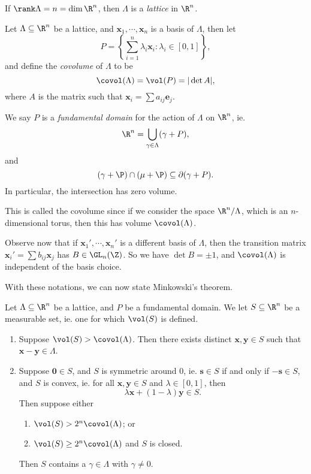 \documentclass[a4paper]{article}
\begin{document}
\begin{defi}[Lattice]
  If $\rank \Lambda = n = \dim \R^n$, then $\Lambda$ is a \emph{lattice} in $\R^n$.
\end{defi}

\begin{defi}
  Let $\Lambda \subseteq \R^n$ be a lattice, and $\mathbf{x}_1, \cdots, \mathbf{x}_n$ is a basis of $\Lambda$, then let
  \[
    P = \left\{\sum_{i = 1}^n \lambda_i \mathbf{x}_i: \lambda_i \in [0, 1]\right\},
  \]
  and define the \emph{covolume} of $\Lambda$ to be
  \[
    \covol(\Lambda) = \vol(P) = |\det A|,
  \]
  where $A$ is the matrix such that $\mathbf{x}_i = \sum a_{ij} \mathbf{e}_j$.

  We say $P$ is a \emph{fundamental domain} for the action of $\Lambda$ on $\R^n$, ie.
  \[
    \R^n = \bigcup_{\gamma \in \Lambda} (\gamma + P),
  \]
  and
  \[
    (\gamma + \P) \cap (\mu + \P) \subseteq \partial (\gamma + P).
  \]
  In particular, the intersection has zero volume.
\end{defi}
This is called the covolume since if we consider the space $\R^n/ \Lambda$, which is an $n$-dimensional torus, then this has volume $\covol (\Lambda)$.

Observe now that if $\mathbf{x}_1', \cdots, \mathbf{x}_n'$ is a different basis of $\Lambda$, then the transition matrix $\mathbf{x}_i' = \sum b_{ij} \mathbf{x}_j$ has $B \in \GL_n (\Z)$. So we have $\det B = \pm 1$, and $\covol (\Lambda)$ is independent of the basis choice.

With these notations, we can now state Minkowski's theorem.

\begin{thm}
  Let $\Lambda \subseteq \R^n$ be a lattice, and $P$ be a fundamental domain. We let $S \subseteq \R^n$ be a measurable set, ie. one for which $\vol(S)$ is defined.
  \begin{enumerate}
    \item Suppose $\vol(S) > \covol(\Lambda)$. Then there exists distinct $\mathbf{x}, \mathbf{y} \in S$ such that $\mathbf{x} - \mathbf{y} \in \Lambda$.
    \item Suppose $\mathbf{0} \in S$, and $S$ is symmetric around $0$, ie. $\mathbf{s} \in S$ if and only if $-\mathbf{s} \in S$, and $S$ is convex, ie. for all $\mathbf{x}, \mathbf{y} \in S$ and $\lambda \in [0, 1]$, then
      \[
        \lambda \mathbf{x} + (1 - \lambda)\mathbf{y} \in S.
      \]
      Then suppose either
      \begin{enumerate}
        \item $\vol (S) > 2^n \covol(\Lambda)$; or
        \item $\vol (S) \geq 2^n \covol(\Lambda)$ and $S$ is closed.
      \end{enumerate}
      Then $S$ contains a $\gamma \in \Lambda$ with $\gamma \not= 0$.
  \end{enumerate}
\end{thm}
\end{document}
